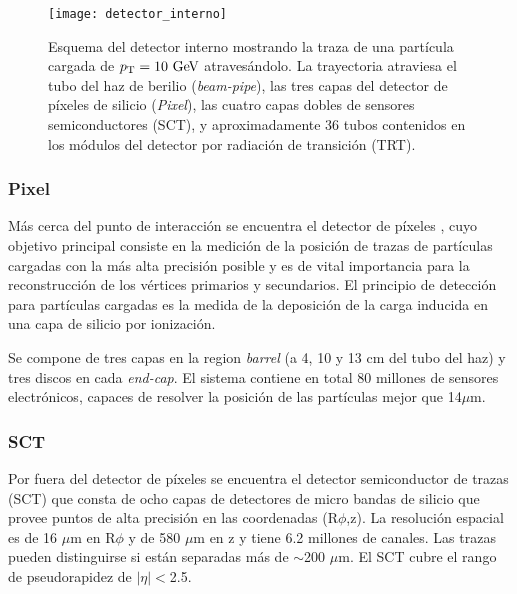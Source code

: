 \begin{figure}[!htbp]
  \centering

  \texttt{[image: detector\_interno]}
  \caption{Esquema del detector interno mostrando la traza de una partícula
    cargada de $\pt = 10\gev$ atravesándolo. La trayectoria atraviesa el
    tubo del haz de berilio (\emph{beam-pipe}), las tres capas del detector de píxeles de silicio (\emph{Pixel}),
    las cuatro capas dobles de sensores semiconductores (SCT), y
    aproximadamente 36 tubos contenidos en los módulos del detector por radiación
  de transición (TRT).}\label{fig:detector_interno}

\end{figure}

\subsubsection{Pixel}

Más cerca del punto de interacción se encuentra el detector de píxeles
\cite{Wermes:381263}, cuyo objetivo principal consiste en la medición de la
posición de trazas de partículas cargadas con la más alta precisión posible y es
de vital importancia para la reconstrucción de los vértices primarios y
secundarios. El principio de detección para partículas cargadas es la medida de
la deposición de la carga inducida en una capa de silicio por ionización.

Se compone de
tres capas en la region \emph{barrel} (a 4, 10 y 13 cm del tubo del haz) y tres
discos en cada \emph{end-cap}.
El sistema
contiene en total 80 millones de sensores electrónicos, capaces de resolver la posición de las partículas mejor que 14$\mu$m.


\subsubsection{SCT}

Por fuera del detector de píxeles se encuentra el detector semiconductor de
trazas (SCT) que consta de ocho capas de detectores de micro bandas de silicio
que provee puntos de alta precisión en las coordenadas (R$\phi$,z). La
resolución espacial es de 16 $\mu$m en R$\phi$ y de 580 $\mu$m en z y tiene 6.2
millones de canales. Las trazas pueden distinguirse si están separadas más de
$\sim$200 $ \mu$m. El SCT cubre el rango de pseudorapidez de $|\eta|<$2.5.


